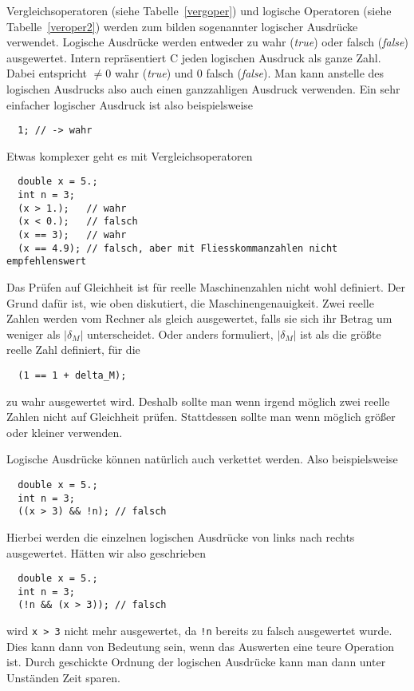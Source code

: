 Vergleichsoperatoren (siehe Tabelle~\ref{vergoper}) und logische Operatoren (siehe Tabelle~\ref{veroper2}) werden zum bilden sogenannter logischer Ausdrücke verwendet.
Logische Ausdrücke werden entweder zu wahr (\emph{true}) oder falsch (\emph{false}) ausgewertet.
Intern repräsentiert C jeden logischen Ausdruck als ganze Zahl.
Dabei entspricht $\neq 0$ wahr (\emph{true}) und $0$ falsch (\emph{false}).
Man kann anstelle des logischen Ausdrucks also auch einen ganzzahligen Ausdruck verwenden.
Ein sehr einfacher logischer Ausdruck ist also beispielsweise
\begin{lstlisting}
  1; // -> wahr
\end{lstlisting}
Etwas komplexer geht es mit Vergleichsoperatoren
\begin{lstlisting}
  double x = 5.;
  int n = 3;
  (x > 1.);   // wahr
  (x < 0.);   // falsch
  (x == 3);   // wahr
  (x == 4.9); // falsch, aber mit Fliesskommanzahlen nicht empfehlenswert
\end{lstlisting}
Das Prüfen auf Gleichheit ist für reelle Maschinenzahlen nicht wohl definiert.
Der Grund dafür ist, wie oben diskutiert, die Maschinengenauigkeit.
Zwei reelle Zahlen werden vom Rechner als gleich ausgewertet, falls sie sich ihr Betrag um weniger als $|\delta_M|$ unterscheidet. 
Oder anders formuliert, $|\delta_M|$ ist als die größte reelle Zahl definiert, für die 
\begin{lstlisting}
  (1 == 1 + delta_M);
\end{lstlisting}
zu wahr ausgewertet wird.
Deshalb sollte man wenn irgend möglich zwei reelle Zahlen nicht auf Gleichheit prüfen.
Stattdessen sollte man wenn möglich größer oder kleiner verwenden.

Logische Ausdrücke können natürlich auch verkettet werden. 
Also beispielsweise
\begin{lstlisting}
  double x = 5.;
  int n = 3;
  ((x > 3) && !n); // falsch
\end{lstlisting}
Hierbei werden die einzelnen logischen Ausdrücke von links nach rechts ausgewertet. 
Hätten wir also geschrieben
\begin{lstlisting}
  double x = 5.;
  int n = 3;
  (!n && (x > 3)); // falsch
\end{lstlisting}
wird \verb|x > 3| nicht mehr ausgewertet, da \verb|!n| bereits zu falsch ausgewertet wurde.
Dies kann dann von Bedeutung sein, wenn das Auswerten eine teure Operation ist.
Durch geschickte Ordnung der logischen Ausdrücke kann man dann unter Unständen Zeit sparen.


